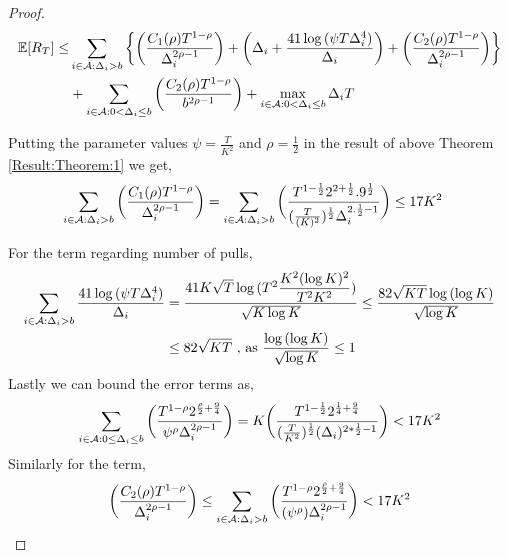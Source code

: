 \begin{proof}
\begin{align*}
\mathbb{E} [R_{T}] \leq &\sum\limits_{i\in \mathcal{A} :\Delta_{i} > b}\bigg\lbrace\bigg(\dfrac{C_{1}(\rho)T^{1-\rho}}{\Delta_{i}^{2\rho -1}}\bigg) + \bigg(\Delta_{i}+\dfrac{41\log{(\psi  T\Delta_{i}^{4})}}{\Delta_{i}}\bigg) + \bigg(\dfrac{ C_{2}(\rho) T^{1-\rho}}{\Delta_{i}^{2\rho-1}} \bigg)\bigg \rbrace\\ 
  & +\sum\limits_{i\in \mathcal{A} :0 < \Delta_{i}\leq b}\bigg(\dfrac{C_{2}(\rho)T^{1-\rho}}{b^{2\rho -1}} \bigg) + \max_{i\in \mathcal{A} :0 < \Delta_{i}\leq b}\Delta_{i}T
\end{align*}
%
%	
%

Putting the parameter values $\psi=\frac{T}{K^2}$ and $\rho=\frac{1}{2}$ in the result of above Theorem \ref{Result:Theorem:1} we get,
	\begin{align*}
	\sum_{i\in \mathcal{A} :\Delta_{i} > b}\bigg(\dfrac{C_{1}(\rho)T^{1-\rho}}{\Delta_{i}^{2\rho -1}}\bigg) &= \sum_{i\in \mathcal{A} :\Delta_{i} > b}\bigg(\dfrac{T^{1-\frac{1}{2}}2^{2+\frac{1}{2}}.9^{\frac{1}{2}}}{(\frac{T}{( K)^2})^{\frac{1}{2}}\Delta_{i}^{2.\frac{1}{2}-1}} \bigg) \leq 17 K^2
	\end{align*}
	 
	
	For the term regarding number of pulls,
	\begin{align*}
	\sum_{i\in \mathcal{A} :\Delta_{i} > b}\dfrac{41\log{(\psi T\Delta_{i}^{4})}}{\Delta_{i}} &= \dfrac{41K\sqrt{T}\log{(T^{2}\dfrac{K^{2}(\log K)^{2}}{T^{2} K^2})}}{\sqrt{K\log K}} \leq  \dfrac{82\sqrt{KT}\log{(\log K)}}{\sqrt{\log K}}\\
	&\leq 82\sqrt{KT} \text{ ,   as $\dfrac{\log{(\log K)}}{\sqrt{\log K}}\leq 1$}
	\end{align*}		
 	Lastly we can bound the error terms as, 
	\begin{align*}
	\sum\limits_{i\in \mathcal{A} :0\leq\Delta_{i}\leq b}\bigg(\dfrac{T^{1-\rho }2^{\frac{\rho}{2} +\frac{9}{4}}}{\psi^{\rho }\Delta_{i}^{2\rho -1}} \bigg)=K\bigg(\dfrac{T^{1-\frac{1}{2}}2^{\frac{1}{4}+\frac{9}{4}}}{{(\frac{T}{K^2})^{\frac{1}{2}}}{(\Delta_{i})^{2*\frac{1}{2}-1}}} \bigg) < 17 K^2
	\end{align*}	 	
 	Similarly for the term,
 	\begin{align*}
 	\bigg(\dfrac{ C_{2}(\rho) T^{1-\rho}}{\Delta_{i}^{2\rho-1}} \bigg) \leq  \sum_{i\in \mathcal{A} : \Delta_{i} > b}\bigg(\dfrac{T^{1-\rho} 2^{\frac{\rho}{2}+\frac{9}{4}}}{(\psi^{\rho})\Delta_{i}^{2\rho -1}} \bigg) < 17  K^2
	\end{align*} 	
 	

\end{proof}
